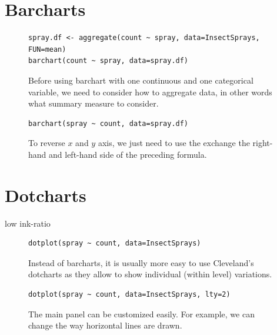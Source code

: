 \documentclass[a4paper,twoside]{book}
\newcounter{fig}
\newcommand{\img}[1]{\texttt{[image: \#1]}\stepcounter{fig}}
\renewcommand{\texttt}[1]{\lstinline{#1}}
\begin{document}
\section{Barcharts}

\begin{figure}[H]
\begin{lstlisting}
spray.df <- aggregate(count ~ spray, data=InsectSprays, FUN=mean)
barchart(count ~ spray, data=spray.df)
\end{lstlisting}
  \fcapside[\FBwidth] {\img{figs_lattice-crop}}
  {\caption*{ Before using barchart with one continuous and
      one categorical variable, we need to consider how to aggregate
      data, in other words what summary measure to consider.}}
\end{figure}

\begin{figure}[H]
\begin{lstlisting}
barchart(spray ~ count, data=spray.df)
\end{lstlisting}
  \fcapside[\FBwidth] {\img{figs_lattice-crop}} {\caption*{To reverse
      $x$ and $y$ axis, we just need to use the exchange the
      right-hand and left-hand side of the preceding formula.}}
\end{figure}

\section{Dotcharts}

low ink-ratio

\begin{figure}[H]
\begin{lstlisting}
dotplot(spray ~ count, data=InsectSprays)
\end{lstlisting}
  \fcapside[\FBwidth] {\img{figs_lattice-crop}}
  {\caption*{Instead of barcharts, it is usually more easy to use
      Cleveland's dotcharts as they allow to show individual
      (within level) variations.}}
\end{figure}

\begin{figure}[H]
\begin{lstlisting}
dotplot(spray ~ count, data=InsectSprays, lty=2)
\end{lstlisting}
  \fcapside[\FBwidth] {\img{figs_lattice-crop}}
  {\caption*{The main panel can be customized easily. For example, we
      can change the way horizontal lines are drawn.}}
\end{figure}
\end{document}
